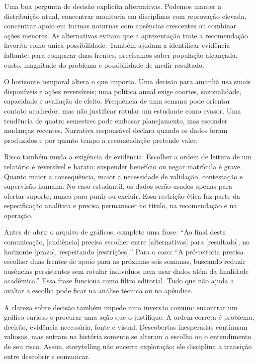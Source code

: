 Uma boa pergunta de decisão explicita alternativas. Podemos manter a distribuição atual, concentrar monitoria em disciplinas com reprovação elevada, concentrar apoio em turmas noturnas com ausências crescentes ou combinar ações menores. As alternativas evitam que a apresentação trate a recomendação favorita como única possibilidade. Também ajudam a identificar evidência faltante: para comparar duas frentes, precisamos saber população alcançada, custo, magnitude do problema e possibilidade de medir resultado.

O horizonte temporal altera o que importa. Uma decisão para amanhã usa sinais disponíveis e ações reversíveis; uma política anual exige coortes, sazonalidade, capacidade e avaliação de efeito. Frequência de uma semana pode orientar contato acolhedor, mas não justificar rotular um estudante como evasor. Uma tendência de quatro semestres pode embasar planejamento, mas esconder mudanças recentes. Narrativa responsável declara quando os dados foram produzidos e por quanto tempo a recomendação pretende valer.

Risco também muda a exigência de evidência. Escolher a ordem de leitura de um relatório é reversível e barato; suspender benefício ou negar matrícula é grave. Quanto maior a consequência, maior a necessidade de validação, contestação e supervisão humana. No caso estudantil, os dados serão usados apenas para ofertar suporte, nunca para punir ou excluir. Essa restrição ética faz parte da especificação analítica e precisa permanecer no título, na recomendação e na operação.

Antes de abrir o arquivo de gráficos, complete uma frase: ``Ao final desta comunicação, [audiência] precisa escolher entre [alternativas] para [resultado], no horizonte [prazo], respeitando [restrições].'' Para o caso: ``A pró-reitoria precisa escolher duas frentes de apoio para as próximas seis semanas, buscando reduzir ausências persistentes sem rotular indivíduos nem usar dados além da finalidade acadêmica.'' Essa frase funciona como filtro editorial. Tudo que não ajuda a avaliar a escolha pode ficar na análise técnica ou no apêndice.

A clareza sobre decisão também impede uma inversão comum: encontrar um gráfico curioso e procurar uma ação que o justifique. A ordem correta é problema, decisão, evidência necessária, fonte e visual. Descobertas inesperadas continuam valiosas, mas entram na história somente se alteram a escolha ou o entendimento de seu risco. Assim, storytelling não encerra exploração; ele disciplina a transição entre descobrir e comunicar.


